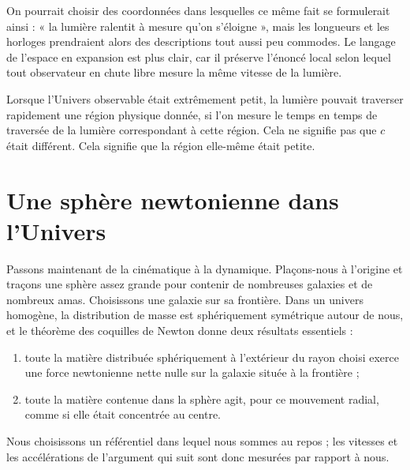 On pourrait choisir des coordonnées dans lesquelles ce même fait se formulerait ainsi : « la lumière ralentit à mesure qu’on s’éloigne », mais les longueurs et les horloges prendraient alors des descriptions tout aussi peu commodes. Le langage de l’espace en expansion est plus clair, car il préserve l’énoncé local selon lequel tout observateur en chute libre mesure la même vitesse de la lumière.

\begin{classroomqa}
\end{classroomqa}

Lorsque l’Univers observable était extrêmement petit, la lumière pouvait traverser rapidement une région physique donnée, si l’on mesure le temps en temps de traversée de la lumière correspondant à cette région. Cela ne signifie pas que \(c\) était différent. Cela signifie que la région elle-même était petite.

\section{Une sphère newtonienne dans l’Univers}

Passons maintenant de la cinématique à la dynamique. Plaçons-nous à l’origine et traçons une sphère assez grande pour contenir de nombreuses galaxies et de nombreux amas. Choisissons une galaxie sur sa frontière. Dans un univers homogène, la distribution de masse est sphériquement symétrique autour de nous, et le théorème des coquilles de Newton donne deux résultats essentiels :
\begin{enumerate}
  \item toute la matière distribuée sphériquement à l’extérieur du rayon choisi exerce une force newtonienne nette nulle sur la galaxie située à la frontière ;
  \item toute la matière contenue dans la sphère agit, pour ce mouvement radial, comme si elle était concentrée au centre.
\end{enumerate}
Nous choisissons un référentiel dans lequel nous sommes au repos ; les vitesses et les accélérations de l’argument qui suit sont donc mesurées par rapport à nous.


